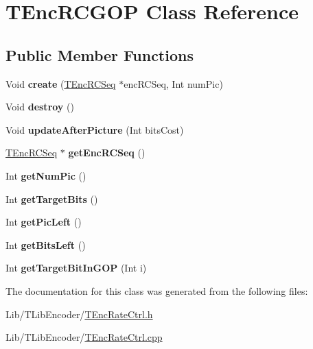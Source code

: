 \hypertarget{class_t_enc_r_c_g_o_p}{}\section{T\+Enc\+R\+C\+G\+OP Class Reference}
\label{class_t_enc_r_c_g_o_p}
\subsection*{Public Member Functions}
\begin{DoxyCompactItemize}
\item 
\mbox{\label{class_t_enc_r_c_g_o_p_a6707e8f47acfc223fe3e8b470c244a40}} 
Void {\bfseries create} (\hyperlink{class_t_enc_r_c_seq}{T\+Enc\+R\+C\+Seq} $\ast$enc\+R\+C\+Seq, Int num\+Pic)
\item 
\mbox{\label{class_t_enc_r_c_g_o_p_a8eb3b124fe47f69b8645c8f02e22dd91}} 
Void {\bfseries destroy} ()
\item 
\mbox{\label{class_t_enc_r_c_g_o_p_a96d89fa3a59a95af7f46b930fe53327b}} 
Void {\bfseries update\+After\+Picture} (Int bits\+Cost)
\item 
\mbox{\label{class_t_enc_r_c_g_o_p_a43a83677ff6be056e4aace7abff3ace9}} 
\hyperlink{class_t_enc_r_c_seq}{T\+Enc\+R\+C\+Seq} $\ast$ {\bfseries get\+Enc\+R\+C\+Seq} ()
\item 
\mbox{\label{class_t_enc_r_c_g_o_p_a78d261c0742ca1e139c9e26ae393fdb5}} 
Int {\bfseries get\+Num\+Pic} ()
\item 
\mbox{\label{class_t_enc_r_c_g_o_p_a91107758738c95e63ad370b03bc1fdd7}} 
Int {\bfseries get\+Target\+Bits} ()
\item 
\mbox{\label{class_t_enc_r_c_g_o_p_a5e03c2a6f37781a69531eddd8028f0a1}} 
Int {\bfseries get\+Pic\+Left} ()
\item 
\mbox{\label{class_t_enc_r_c_g_o_p_af0320ce4a9b3a8f6e4e98f04ee93e7c3}} 
Int {\bfseries get\+Bits\+Left} ()
\item 
\mbox{\label{class_t_enc_r_c_g_o_p_ae56e12a154fa2158e6fcbaaff0031570}} 
Int {\bfseries get\+Target\+Bit\+In\+G\+OP} (Int i)
\end{DoxyCompactItemize}


The documentation for this class was generated from the following files\+:\begin{DoxyCompactItemize}
\item 
Lib/\+T\+Lib\+Encoder/\hyperlink{_t_enc_rate_ctrl_8h}{T\+Enc\+Rate\+Ctrl.\+h}\item 
Lib/\+T\+Lib\+Encoder/\hyperlink{_t_enc_rate_ctrl_8cpp}{T\+Enc\+Rate\+Ctrl.\+cpp}\end{DoxyCompactItemize}
